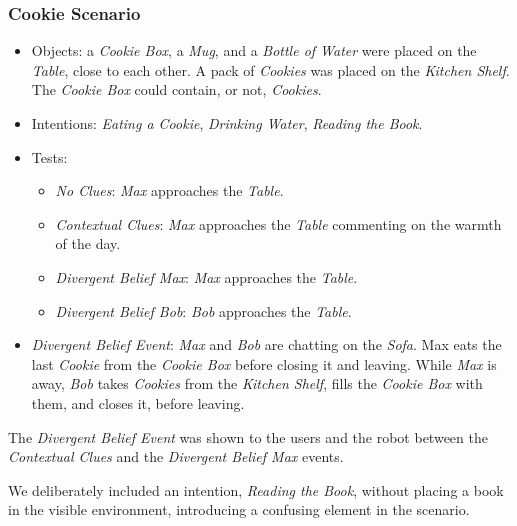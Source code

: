 \subsubsection{Cookie Scenario}
\begin{itemize}
\item Objects: a \textit{Cookie Box}, a \textit{Mug}, and a \textit{Bottle of Water} were placed on the \textit{Table}, close to each other. A pack of \textit{Cookies} was placed on the \textit{Kitchen Shelf}. The \textit{Cookie Box} could contain, or not, \textit{Cookies}.
\item Intentions: \textit{Eating a Cookie}, \textit{Drinking Water}, \textit{Reading the Book}.
\item Tests:
\begin{itemize}
	\item \textit{No Clues}: \textit{Max} approaches the \textit{Table}.
    \item \textit{Contextual Clues}: \textit{Max} approaches the \textit{Table} commenting on the warmth of the day.
	\item \textit{Divergent Belief Max}: \textit{Max} approaches the \textit{Table}.
	\item \textit{Divergent Belief Bob}: \textit{Bob} approaches the \textit{Table}.
\end{itemize}
\item  \textit{Divergent Belief Event}:  \textit{Max} and \textit{Bob} are chatting on the \textit{Sofa}. Max eats the last \textit{Cookie} from the \textit{Cookie Box} before closing it and leaving. While \textit{Max} is away, \textit{Bob} takes \textit{Cookies} from the \textit{Kitchen Shelf}, fills the \textit{Cookie Box} with them, and closes it, before leaving.
\end{itemize}

The \textit{Divergent Belief Event} was shown to the users and the robot between the \textit{Contextual Clues} and the \textit{Divergent Belief Max} events. 

We deliberately included an intention, \textit{Reading the Book}, without placing a book in the visible environment, introducing a confusing element in the scenario.

